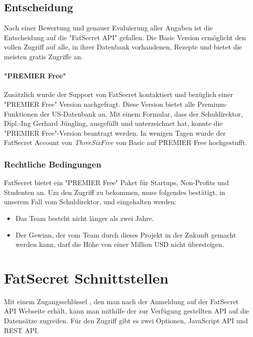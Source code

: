 \subsection{Entscheidung}

Nach einer Bewertung und genauer Evaluierung aller Angaben ist die Entscheidung auf die "FatSecret API" gefallen. Die Basic Version ermöglicht den vollen Zugriff auf alle, in ihrer Datenbank vorhandenen, Rezepte und bietet die meisten gratis Zugriffe an. 
\paragraph{"PREMIER Free"}
Zusätzlich wurde der Support von FatSecret kontaktiert und bezüglich einer "PREMIER Free" Version nachgefragt. Diese Version bietet alle Premium-Funktionen der US-Datenbank an.
Mit einem Formular, dass der Schuldirektor, Dipl.-Ing Gerhard Jüngling, ausgefüllt und unterzeichnet hat, konnte die "PREMIER Free"-Version beantragt werden. In wenigen Tagen wurde der FatSecret Account von \textit{ThreeSixFive} von Basic auf PREMIER Free hochgestufft.

\subsubsection{Rechtliche Bedingungen}

FatSecret bietet ein "PREMIER Free" Paket für Startups, Non-Profits und Studenten an. Um den Zugriff zu bekommen, muss folgendes bestätigt, in unserem Fall vom Schuldirektor, und eingehalten werden:

\begin{itemize}
\item Das Team besteht nicht länger als zwei Jahre.
\item Der Gewinn, der vom Team durch dieses Projekt in der Zukunft gemacht werden kann, darf die Höhe von einer Million USD nicht übersteigen.
\end{itemize}

\section{FatSecret Schnittstellen}

Mit einem Zugangsschlüssel \cite{fatsecretJS}, den man nach der Anmeldung auf der FatSecret API Webseite erhält, kann man mithilfe der zur Verfügung gestellten API auf die Datensätze zugreifen. Für den Zugriff gibt es zwei Optionen, JavaScript API und REST API.

